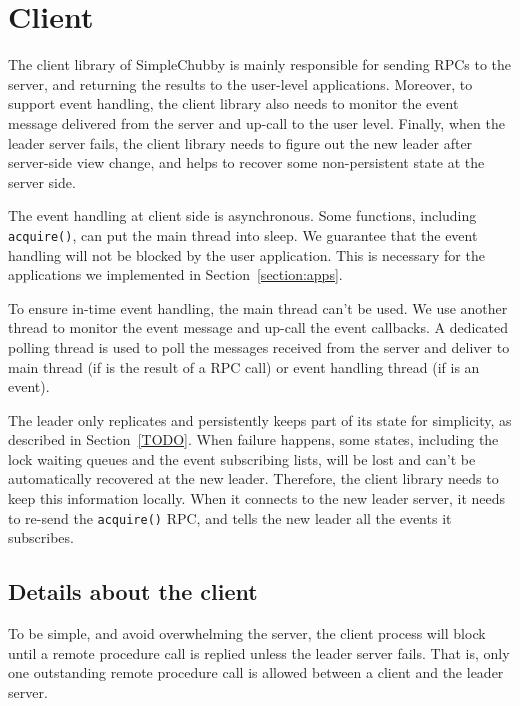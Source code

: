 \section{Client}
\label{section:client}

The client library of SimpleChubby is mainly responsible for sending RPCs to the
server, and returning the results to the user-level applications. Moreover, to
support event handling, the client library also needs to monitor the event
message delivered from the server and up-call to the user level. Finally, when
the leader server fails, the client library needs to figure out the new leader
after server-side view change, and helps to recover some non-persistent state
at the server side.

The event handling at client side is asynchronous. Some functions, including
\texttt{acquire()}, can put the main thread into sleep. We guarantee that the
event handling will not be blocked by the user application. This is necessary
for the applications we implemented in Section~\ref{section:apps}.

To ensure in-time event handling, the main thread can't be used. We use
another thread to monitor the event message and up-call the event callbacks.
A dedicated polling thread is used to poll the messages received from the server
and deliver to main thread (if is the result of a RPC call) or event handling
thread (if is an event).


The leader only replicates and persistently keeps part of its state for
simplicity, as described in Section~\ref{TODO}. When failure happens, some
states, including the lock waiting queues and the event subscribing lists,
will be lost and can't be automatically recovered at the new leader. Therefore,
the client library needs to keep this information locally. When it connects
to the new leader server, it needs to re-send the \texttt{acquire()} RPC,
and tells the new leader all the events it subscribes.

\subsection{Details about the client}
To be simple, and avoid overwhelming the server, the client process will block until a remote procedure call is
replied unless the leader server fails. That is, only one outstanding remote procedure call is allowed between
a client and the leader server.


